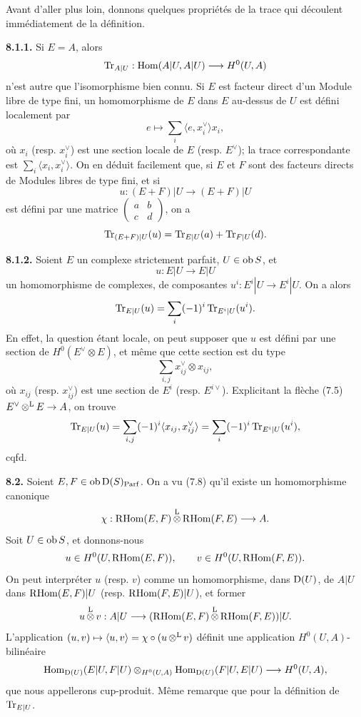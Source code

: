 \documentclass[11pt]{article}
\newcommand{\Parf}{\operatorname{Parf}}
\begin{document}
Avant d'aller plus loin, donnons quelques propriétés de la trace qui découlent immédiatement de la définition.

\textbf{8.1.1.} Si \(E=A\), alors
\[
  \operatorname{Tr}_{A|U}:\operatorname{Hom}(A|U,A|U)\longrightarrow H^0(U,A)
\]
n'est autre que l'isomorphisme bien connu. Si \(E\) est facteur direct d'un Module libre de type fini, un homomorphisme de \(E\) dans \(E\) au-dessus de \(U\) est défini localement par
\[
  e\longmapsto \sum_i\langle e,x_i^\vee\rangle x_i,
\]
où \(x_i\) (resp. \(x_i^\vee\)) est une section locale de \(E\) (resp. \(E^\vee\)); la trace correspondante est \(\sum_i\langle x_i,x_i^\vee\rangle\). On en déduit facilement que, si \(E\) et \(F\) sont des facteurs directs de Modules libres de type fini, et si
\[
  u:(E+F)|U\longrightarrow(E+F)|U
\]
est défini par une matrice \(\begin{pmatrix}a&b\\ c&d\end{pmatrix}\), on a
\[
  \operatorname{Tr}_{(E+F)|U}(u)=\operatorname{Tr}_{E|U}(a)+\operatorname{Tr}_{F|U}(d).
\]

\textbf{8.1.2.} Soient \(E\) un complexe strictement parfait, \(U\in\operatorname{ob} S\), et
\[
  u:E|U\longrightarrow E|U
\]
un homomorphisme de complexes, de composantes \(u^i:E^i|U\to E^i|U\). On a alors
\[
  \operatorname{Tr}_{E|U}(u)=\sum_i(-1)^i\operatorname{Tr}_{E^i|U}(u^i).
\]
En effet, la question étant locale, on peut supposer que \(u\) est défini par une section de \(H^0(E^\vee\otimes E)\), et même que cette section est du type
\[
  \sum_{i,j}x_{ij}^\vee\otimes x_{ij},
\]
où \(x_{ij}\) (resp. \(x_{ij}^\vee\)) est une section de \(E^i\) (resp. \(E^{i\vee}\)). Explicitant la flèche (7.5) \(E^\vee\mathop{\otimes}^{\mathrm L} E\to A\), on trouve
\[
  \operatorname{Tr}_{E|U}(u)=\sum_{i,j}(-1)^i\langle x_{ij},x_{ij}^\vee\rangle
  =\sum_i(-1)^i\operatorname{Tr}_{E^i|U}(u^i),
\]
cqfd.

\textbf{8.2.} Soient \(E,F\in\Ob\Dpx(S)_{\Parf}\). On a vu (7.8) qu'il existe un homomorphisme canonique
\[
  \chi:\mathrm R\!\operatorname{Hom}(E,F)\mathop{\otimes}^{\mathrm L}\mathrm R\!\operatorname{Hom}(F,E)\longrightarrow A.
\]
Soit \(U\in\operatorname{ob} S\), et donnons-nous
\[
  u\in H^0(U,\mathrm R\!\operatorname{Hom}(E,F)),\qquad v\in H^0(U,\mathrm R\!\operatorname{Hom}(F,E)).
\]
On peut interpréter \(u\) (resp. \(v\)) comme un homomorphisme, dans \(\mathrm D(U)\), de \(A|U\) dans \(\mathrm R\!\operatorname{Hom}(E,F)|U\) (resp. \(\mathrm R\!\operatorname{Hom}(F,E)|U\)), et former
\[
  u\mathop{\otimes}^{\mathrm L} v:A|U\longrightarrow(\mathrm R\!\operatorname{Hom}(E,F)\mathop{\otimes}^{\mathrm L}\mathrm R\!\operatorname{Hom}(F,E))|U.
\]
L'application \((u,v)\mapsto\langle u,v\rangle=\chi\circ(u\mathop{\otimes}^{\mathrm L} v)\) définit une application \(H^0(U,A)\)-bilinéaire
\[
  \operatorname{Hom}_{\mathrm D(U)}(E|U,F|U)\otimes_{H^0(U,A)}\operatorname{Hom}_{\mathrm D(U)}(F|U,E|U)
  \longrightarrow H^0(U,A),
\]
que nous appellerons cup-produit. Même remarque que pour la définition de \(\operatorname{Tr}_{E|U}\).
\end{document}
